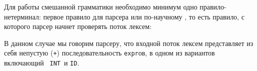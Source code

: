 
Для работы смешанной грамматики необходимо минимум одно правило-нетерминал:
первое правило для парсера или по-научному , то есть правило, 
с которого парсер начнет проверять поток лексем:


В данном случае мы говорим парсеру, что входной поток лексем представляет из 
себя непустую (\verb|+|) последовательность \verb|expr|ов, в одном из вариантов
включающий \ \verb|INT|\ и \verb|ID|.

\secup
